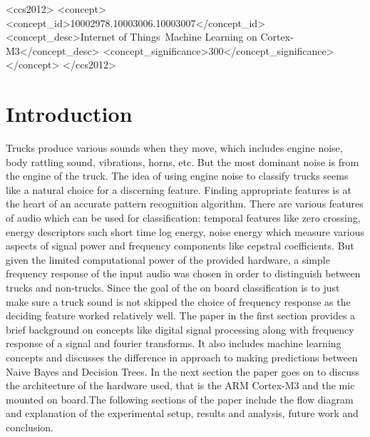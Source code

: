 \documentclass[sigconf, authorversion=false,  screen=true]{acmart}
\begin{document}
%
%
\begin{CCSXML}
<ccs2012>
 <concept>
   <concept_id>10002978.10003006.10003007</concept_id>
   <concept_desc>Internet of Things~Machine Learning on Cortex-M3</concept_desc>
   <concept_significance>300</concept_significance>
 </concept>
</ccs2012>
\end{CCSXML}



{}

\maketitle

\section{Introduction}
	Trucks produce various sounds when they move, which includes engine noise, body rattling sound, vibrations, horns, etc. But the most dominant noise is from the engine of the truck. The idea of using engine noise to classify trucks seems like a natural choice for a discerning feature. 
	Finding appropriate features is at the heart of an accurate pattern recognition algorithm. There are various features of audio which can be used for classification: temporal features like zero crossing, energy descriptors such short time log energy, noise energy which measure various aspects of signal power and frequency components like cepstral coefficients. But given the limited computational power of the provided hardware, a simple frequency response of the input audio was chosen in order to distinguish between trucks and non-trucks. Since the goal of the on board classification is to just make sure a truck sound is not skipped the choice of frequency response as the deciding feature worked relatively well.
	The paper in the first section provides a brief background on concepts like digital signal processing along with frequency response of a signal and fourier transforms. It also includes machine learning concepts and discusses the difference in approach to making predictions between Naive Bayes and Decision Trees. In the next section the paper goes on to discuss the architecture of the hardware used, that is the ARM Cortex-M3 and the mic mounted on board.The following sections of the paper include the flow diagram and explanation of the experimental setup, results and analysis, future work and conclusion.
\end{document}

